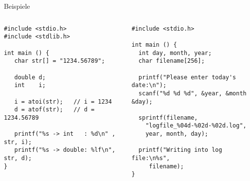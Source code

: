 \begin{frame}[fragile]{Beispiele}
%
\vspace{-15pt}
\begin{columns}[T]
\begin{codebox}
\begin{verbatim}
#include <stdio.h>
#include <stdlib.h>

int main () {
   char str[] = "1234.56789";

   double d;
   int    i;

   i = atoi(str);   // i = 1234
   d = atof(str);   // d = 1234.56789

   printf("%s -> int   : %d\n" , str, i);
   printf("%s -> double: %lf\n", str, d);
}
\end{verbatim}
\end{codebox}
%
\begin{codebox}[sprintf]
\begin{verbatim}
#include <stdio.h>

int main () {
  int day, month, year;
  char filename[256];
	
  printf("Please enter today's date:\n");
  scanf("%d %d %d", &year, &month &day);
	
  sprintf(filename, 
    "logfile_%04d-%02d-%02d.log",
    year, month, day);
    
  printf("Writing into log file:\n%s", 
     filename);
}
\end{verbatim}
\end{codebox}
\end{columns}
%
\end{frame}
